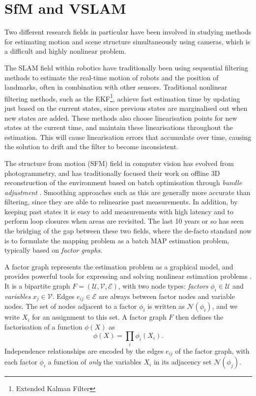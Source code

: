 \chapter{SfM and VSLAM}
Two different research fields in particular have been involved in studying methods for estimating motion and scene structure simultaneously using cameras, which is a difficult and highly nonlinear problem.

The SLAM field within robotics have traditionally been using sequential filtering methods \cite{Thrun2002ProbabilisticRobotics} to estimate the real-time motion of robots and the position of landmarks, often in combination with other sensors.
Traditional nonlinear filtering methods, such as the EKF\footnote{Extended Kalman Filter}, achieve fast estimation time by updating just based on the current states, since previous states are marginalised out when new states are added.
These methods also choose linearisation points for new states at the current time, and maintain these linearisations throughout the estimation.
This will cause linearisation errors that accumulate over time, causing the solution to drift and the filter to become inconsistent.

The structure from motion (SFM) field in computer vision has evolved from photogrammetry, and has traditionally focused their work on offline 3D reconstruction of the environment based on batch optimisation through \textit{bundle adjustment} \cite{Triggs2000BundleSynthesis}.
Smoothing approaches such as this are generally more accurate than filtering, since they are able to relinearise past measurements.
In addition, by keeping past states it is easy to add measurements with high latency and to perform loop closures when areas are revisited.
The last 10 years or so has seen the bridging of the gap between these two fields, where the de-facto standard now is to formulate the mapping problem as a batch MAP estimation problem\cite{Strasdat2012VisualFilter, Cadena2016}, typically based on \textit{factor graphs}.

A factor graph represents the estimation problem as a graphical model, and provides powerful tools for expressing and solving nonlinear estimation problems \cite{Dellaert2017}.
It is a bipartite graph $F = (\mathcal{U}, \mathcal{V}, \mathcal{E})$, with two node types: \textit{factors} $\phi_i \in \mathcal{U}$ and \textit{variables} $x_j \in \mathcal{V}$.
Edges $e_{ij} \in \mathcal{E}$ are always between factor nodes and variable nodes.
The set of nodes adjacent to a factor $\phi_i$ is written as $\mathcal{N}(\phi_i)$, and we write $X_i$ for an assignment to this set.
A factor graph $F$ then defines the factorisation of a function $\phi(X)$ as
\begin{equation}
    \phi(X) = \prod_i{\phi_i(X_i)}. \label{eqn:factor}
\end{equation}
Independence relationships are encoded by the edges $e_{ij}$ of the factor graph, with each factor $\phi_i$ a function of \textit{only} the variables $X_i$ in its adjacency set $\mathcal{N}(\phi_j)$.

